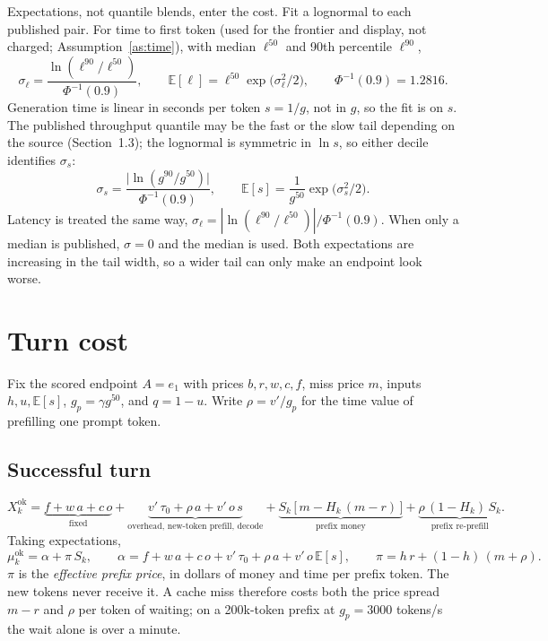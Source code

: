 \documentclass[11pt]{article}
\newcommand{\E}{\mathbb{E}}
\begin{document}
Expectations, not quantile blends, enter the cost. Fit a lognormal to each
published pair. For time to first token (used for the frontier and display,
not charged; Assumption~\ref{as:time}), with median $\ell^{50}$ and 90th
percentile $\ell^{90}$,
\begin{equation}\label{eq:lognormal-l}
  \sigma_\ell = \frac{\ln(\ell^{90} / \ell^{50})}{\Phi^{-1}(0.9)},
  \qquad
  \E[\ell] = \ell^{50} \exp\!\big(\sigma_\ell^2 / 2\big),
  \qquad \Phi^{-1}(0.9) = 1.2816 .
\end{equation}
Generation time is linear in seconds per token $s = 1/g$, not in $g$, so the
fit is on $s$. The published throughput quantile may be the fast or the slow
tail depending on the source (Section~1.3); the lognormal is symmetric in
$\ln s$, so either decile identifies $\sigma_s$:
\begin{equation}\label{eq:lognormal-s}
  \sigma_s = \frac{\big|\ln(g^{90} / g^{50})\big|}{\Phi^{-1}(0.9)},
  \qquad
  \E[s] = \frac{1}{g^{50}} \exp\!\big(\sigma_s^2 / 2\big).
\end{equation}
Latency is treated the same way, $\sigma_\ell = |\ln(\ell^{90}/\ell^{50})| / \Phi^{-1}(0.9)$.
When only a median is published, $\sigma = 0$ and the median is used. Both
expectations are increasing in the tail width, so a wider tail can only make an
endpoint look worse.

\section{Turn cost}

Fix the scored endpoint $A = e_1$ with prices $b, r, w, c, f$, miss price $m$,
inputs $h, u, \E[s]$, $g_p = \gamma g^{50}$, and $q = 1 - u$. Write
$\rho = v'/g_p$ for the time value of prefilling one prompt token.

\subsection{Successful turn}

\begin{equation}\label{eq:turn-ok}
  X_k^{\text{ok}}
  = \underbrace{f + w\,a + c\,o}_{\text{fixed}}
  + \underbrace{v'\,\tau_0 + \rho\, a + v'\, o\, s}_{\text{overhead, new-token prefill, decode}}
  + \underbrace{S_k\,\big[\, m - H_k\,(m - r)\,\big]}_{\text{prefix money}}
  + \underbrace{\rho\,(1 - H_k)\, S_k}_{\text{prefix re-prefill}} .
\end{equation}
Taking expectations,
\begin{equation}\label{eq:turn-ok-mean}
  \mu_k^{\text{ok}} = \alpha + \pi\, S_k,
  \qquad
  \alpha = f + w\,a + c\,o + v'\,\tau_0 + \rho\, a + v'\, o\,\E[s],
  \qquad
  \pi = h\, r + (1 - h)\,(m + \rho) .
\end{equation}
$\pi$ is the \emph{effective prefix price}, in dollars of money and time per
prefix token. The new tokens never receive it. A cache miss therefore costs
both the price spread $m - r$ and $\rho$ per token of waiting; on a 200k-token
prefix at $g_p = 3000$ tokens/s the wait alone is over a minute.
\end{document}
